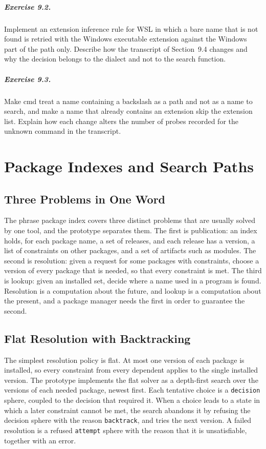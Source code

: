 \documentclass[11pt,oneside]{report}
\theoremstyle{plain}
\theoremstyle{definition}
\theoremstyle{remark}
\begin{document}
\paragraph{Exercise 9.2.} Implement an extension inference rule for WSL in which a bare name that is not found is retried with the Windows executable extension against the Windows part of the path only. Describe how the transcript of Section~9.4 changes and why the decision belongs to the dialect and not to the search function.

\paragraph{Exercise 9.3.} Make cmd treat a name containing a backslash as a path and not as a name to search, and make a name that already contains an extension skip the extension list. Explain how each change alters the number of probes recorded for the unknown command in the transcript.

\chapter{Package Indexes and Search Paths}

\section{Three Problems in One Word}

The phrase package index covers three distinct problems \cite{cox19} that are usually solved by one tool, and the prototype separates them. The first is publication: an index holds, for each package name, a set of releases, and each release has a version, a list of constraints on other packages, and a set of artifacts such as modules. The second is resolution: given a request for some packages with constraints, choose a version of every package that is needed, so that every constraint is met. The third is lookup: given an installed set, decide where a name used in a program is found. Resolution is a computation about the future, and lookup is a computation about the present, and a package manager needs the first in order to guarantee the second.

\section{Flat Resolution with Backtracking}

The simplest resolution policy is flat. At most one version of each package is installed, so every constraint from every dependent applies to the single installed version. The prototype implements the flat solver as a depth-first search over the versions of each needed package, newest first. Each tentative choice is a \texttt{decision} sphere, coupled to the decision that required it. When a choice leads to a state in which a later constraint cannot be met, the search abandons it by refusing the decision sphere with the reason \texttt{backtrack}, and tries the next version. A failed resolution is a refused \texttt{attempt} sphere with the reason that it is unsatisfiable, together with an error.
\end{document}
